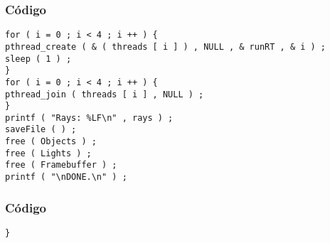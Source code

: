\documentclass{beamer}
\begin{document}
\begin{frame}[fragile]
\frametitle{C\'odigo}
\begin{verbatim}
for ( i = 0 ; i < 4 ; i ++ ) { 
pthread_create ( & ( threads [ i ] ) , NULL , & runRT , & i ) ; 
sleep ( 1 ) ; 
} 
for ( i = 0 ; i < 4 ; i ++ ) { 
pthread_join ( threads [ i ] , NULL ) ; 
} 
printf ( "Rays: %LF\n" , rays ) ; 
saveFile ( ) ; 
free ( Objects ) ; 
free ( Lights ) ; 
free ( Framebuffer ) ; 
printf ( "\nDONE.\n" ) ; 
\end{verbatim}
\end{frame}
\begin{frame}[fragile]
\frametitle{C\'odigo}
\begin{verbatim}
} \end{verbatim}
\end{frame}
\end{document}
